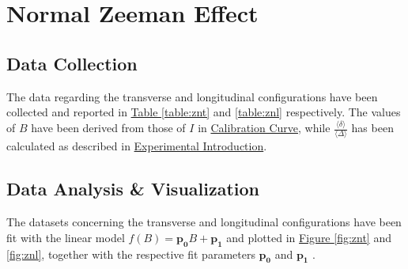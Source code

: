 \documentclass[a4paper,12pt,abstracton]{scrartcl}
\begin{document}
\section{Normal Zeeman Effect}

\subsection{Data Collection}

The data regarding the transverse and longitudinal configurations have been collected and reported in \hyperref[table:znt]{Table \ref*{table:znt}} and \hyperref[table:znl]{ \ref*{table:znl}} respectively. The values of $B$ have been derived from those of $I$ in \hyperref[sec:cal]{Calibration Curve}, while $\frac{\langle \delta \rangle}{\langle \Delta \rangle}$ has been calculated as described in \hyperref[sec:ExpIntro]{Experimental Introduction}.

\subsection{Data Analysis \& Visualization}

The datasets concerning the transverse and longitudinal configurations have been fit with the linear model $f(B)=\boldsymbol{p_0}B+\boldsymbol{p_1}$ and plotted in \hyperref[fig:znt]{Figure \ref*{fig:znt}} and \hyperref[fig:znl]{ \ref*{fig:znl}}, together with the respective fit parameters $\boldsymbol{p_0}$ and  $\boldsymbol{p_1}$ .


\begin{table}[H]
\centering
\caption{}
\label{table:znt}
\end{table}
\end{document}
